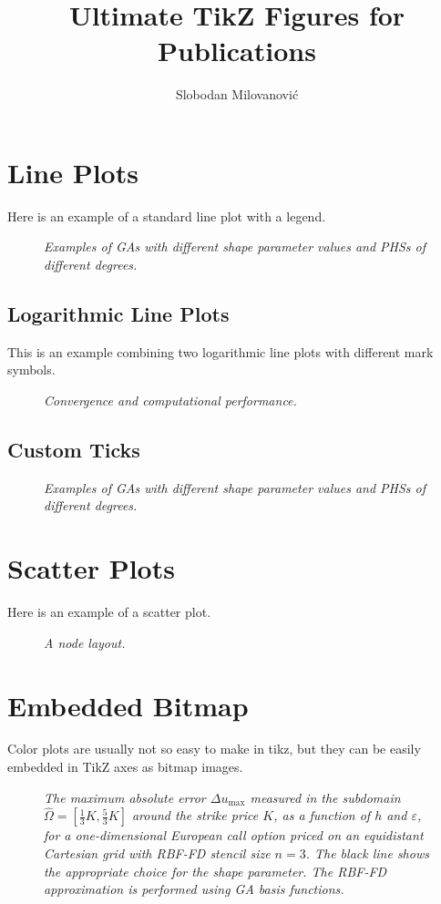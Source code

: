\documentclass[11pt, oneside]{article}   	%
\title{Ultimate TikZ Figures for Publications}
\author{Slobodan Milovanovi\'c}
\begin{document}
\maketitle
%
%
%
\section{Line Plots}
Here is an example of a standard line plot with a legend.
%
\begin{figure}[H]
\centering

\caption{\emph{Examples of GAs with different shape parameter values and PHSs of different degrees.}}
\label{fig:RBF}
\end{figure}
%
%
\subsection{Logarithmic Line Plots}
This is an example combining two logarithmic line plots with different mark symbols.
\begin{figure}[H]
\centering


\caption{\emph{Convergence and computational performance.}}
\label{fig:log}
\end{figure}
%
\subsection{Custom Ticks}
%
\begin{figure}[H]
\centering

\caption{\emph{Examples of GAs with different shape parameter values and PHSs of different degrees.}}
\label{fig:payoff}
\end{figure}
%
%
%
\newpage
\section{Scatter Plots}
Here is an example of a scatter plot.
\begin{figure}[H]
\centering

\caption{\emph{A node layout.}}
\label{fig:stencils}
\end{figure}

\newpage
\section{Embedded Bitmap}
Color plots are usually not so easy to make in tikz, but they can be easily embedded in TikZ axes as bitmap images. 
\begin{figure}[H]
\centering


\caption{\emph{The maximum absolute error $\Delta u_{\max}$ measured in the subdomain $\hat\Omega=[\frac{1}{3}K,\frac{5}{3}K]$ around the strike price $K$, as a function of $h$ and $\varepsilon$, for a one-dimensional European call option priced on an equidistant Cartesian grid with RBF-FD stencil size $n=3$. The black line shows the appropriate choice for the shape parameter. The RBF-FD approximation is performed using GA basis functions.}}
\label{fig:contour1}
\end{figure}
\end{document}
